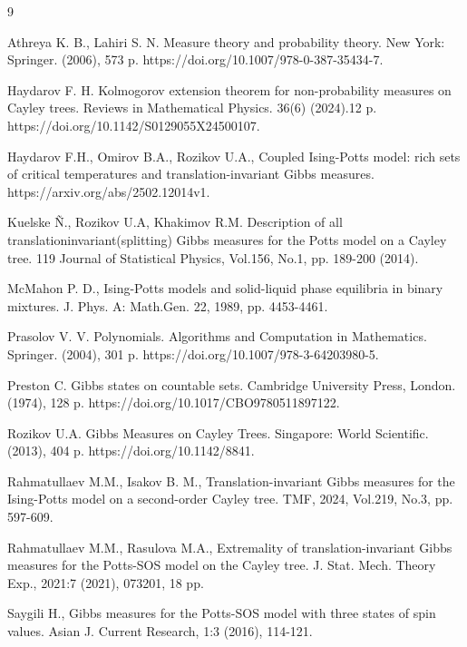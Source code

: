 \documentclass[sn-mathphys]{sn-jnl}%
\theoremstyle{thmstyleone}%
\theoremstyle{thmstyletwo}%
\theoremstyle{thmstylethree}%
\begin{document}
\begin{thebibliography}{9}

 Athreya K. B., Lahiri S. N. Measure theory and probability theory. New York: Springer. (2006), 573 p. https://doi.org/10.1007/978-0-387-35434-7.

 Haydarov F. H. Kolmogorov extension theorem for non-probability measures on Cayley trees. Reviews in Mathematical Physics. 36(6) (2024).12 p. https://doi.org/10.1142/S0129055X24500107.

 Haydarov F.H., Omirov B.A., Rozikov U.A., Coupled Ising-Potts model: rich sets of critical temperatures and translation-invariant Gibbs measures.
https://arxiv.org/abs/2502.12014v1.

 Kuelske Ñ., Rozikov U.A, Khakimov R.M. Description of all translationinvariant(splitting) Gibbs measures for the Potts model on a Cayley tree. 119
Journal of Statistical Physics, Vol.156, No.1, pp. 189-200  (2014).

 McMahon  P. D., Ising-Potts models and solid-liquid phase equilibria in binary mixtures. J. Phys. A: Math.Gen. 22, 1989, pp. 4453-4461.

 Prasolov V. V. Polynomials. Algorithms and Computation in Mathematics. Springer. (2004), 301 p. https://doi.org/10.1007/978-3-64203980-5.

  Preston C. Gibbs states on countable sets. Cambridge University Press, London. (1974), 128 p. https://doi.org/10.1017/CBO9780511897122.

 Rozikov U.A. Gibbs Measures on Cayley Trees. Singapore: World Scientific. (2013), 404 p. https://doi.org/10.1142/8841.

 Rahmatullaev M.M., Isakov  B. M., Translation-invariant Gibbs measures for the Ising-Potts model on a second-order Cayley tree. TMF, 2024, Vol.219, No.3, pp. 597-609.

 Rahmatullaev M.M., Rasulova M.A., Extremality of translation-invariant Gibbs measures for the Potts-SOS model on the Cayley tree. J. Stat. Mech. Theory Exp., 2021:7 (2021), 073201, 18 pp.

 Saygili H., Gibbs measures for the Potts-SOS model with three states of spin values. Asian J. Current Research, 1:3 (2016), 114-121.

\end{thebibliography}
\end{document}
